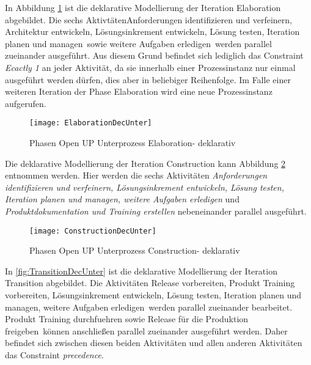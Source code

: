 In Abbildung \ref{fig:ElaborationDecUnter} ist die deklarative Modellierung der Iteration Elaboration abgebildet. Die sechs Aktivtäten\grqq Anforderungen identifizieren und verfeinern, Architektur entwickeln, Lösungsinkrement entwickeln, Lösung testen, Iteration planen und managen\grqq \ sowie \grqq weitere Aufgaben erledigen\grqq \ werden parallel zueinander ausgeführt. Aus diesem Grund befindet sich lediglich das Constraint \textit{Ecactly 1} an jeder Aktivität, da sie innerhalb einer Prozessinstanz nur einmal ausgeführt werden dürfen, dies aber in beliebiger Reihenfolge. Im Falle einer weiteren Iteration der Phase Elaboration wird eine neue Prozessinstanz aufgerufen. \newline

\begin{figure}[htp]
\begin{center}
  \texttt{[image: ElaborationDecUnter]} %
  \caption{Phasen Open UP Unterprozess Elaboration- deklarativ} 
  \label{fig:ElaborationDecUnter}
\end{center}
\end{figure}

Die deklarative Modellierung der Iteration Construction kann Abbildung \ref{fig:ConstructionDecUnter} entnommen werden. Hier werden die sechs Aktivitäten \textit{Anforderungen identifizieren und verfeinern, Lösungsinkrement entwickeln, Lösung testen, Iteration planen und managen, weitere Aufgaben erledigen} und \textit{Produktdokumentation und Training erstellen} nebeneinander parallel ausgeführt.
\begin{figure}[htp]
\begin{center}
  \texttt{[image: ConstructionDecUnter]} %
  \caption{Phasen Open UP Unterprozess Construction- deklarativ}
  \label{fig:ConstructionDecUnter}
\end{center}
\end{figure}

In \ref{fig:TransitionDecUnter} ist die deklarative Modellierung der Iteration Transition abgebildet.\newline
Die Aktivitäten \grqq Release vorbereiten, Produkt Training vorbereiten, Lösungsinkrement entwickeln, Lösung testen, Iteration planen und managen, weitere Aufgaben erledigen\grqq \ werden parallel zueinander bearbeitet. Produkt Training durchfuehren sowie \grqq Release für die Produktion freigeben\grqq \  können anschließen parallel zueinander ausgeführt werden. Daher befindet sich zwischen diesen beiden Aktivitäten und allen anderen Aktivitäten das Constraint \textit{precedence}.

